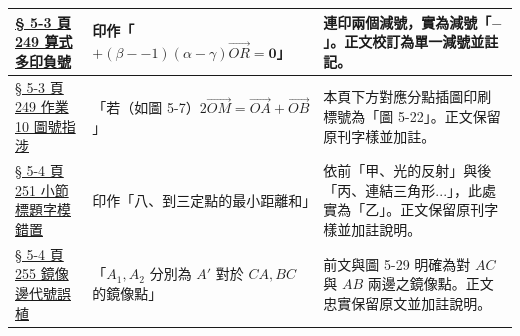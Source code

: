 \documentclass[a4paper,12pt,twoside]{article}
\begin{document}
\begin{table}[H]
\begin{tabularx}{\textwidth}{|p{3.2cm}|p{3.8cm}|X|}
\hyperref[note:b3-ch5-p249-double-minus]{§ 5-3 頁 249 算式多印負號} & 
印作「$+(\beta--1)(\alpha-\gamma)\vec{OR} = \mathbf{0}$」 & 
連印兩個減號，實為減號「$-$」。正文校訂為單一減號並註記。 \\ \hline

\hyperref[note:b3-ch5-p249-fig-ref]{§ 5-3 頁 249 作業 10 圖號指涉} & 
「若（如圖 5-7）$2\vec{OM} = \vec{OA} + \vec{OB}$」 & 
本頁下方對應分點插圖印刷標號為「圖 5-22」。正文保留原刊字樣並加註。 \\ \hline

\hyperref[note:b3-ch5-p251-sec-title]{§ 5-4 頁 251 小節標題字模錯置} & 
印作「八、到三定點的最小距離和」 & 
依前「甲、光的反射」與後「丙、連結三角形...」，此處實為「乙」。正文保留原刊字樣並加註說明。 \\ \hline

\hyperref[note:b3-ch5-p255-mirror-line]{§ 5-4 頁 255 鏡像邊代號誤植} & 
「$A_1, A_2$ 分別為 $A'$ 對於 $CA, BC$ 的鏡像點」 & 
前文與圖 5-29 明確為對 $AC$ 與 $AB$ 兩邊之鏡像點。正文忠實保留原文並加註說明。 \\ \hline

\end{tabularx}
\end{table}
\end{document}
